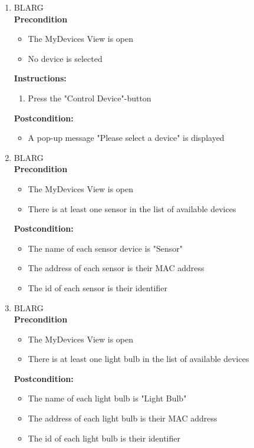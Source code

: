 \documentclass[a4paper]{article}
\newlength{\testlabellength}
\newenvironment{testlist}{\begin{enumerate}[label=\bfseries Instruction \thesubsection.\arabic* , labelindent=0pt, labelwidth=\testlabellength , leftmargin=2cm]}{\end{enumerate}}
\newenvironment{precondition}{
{\color{white}BLARG}\\ 
\textbf{Precondition}
\begin{itemize}[labelindent=0cm, labelwidth=2cm , leftmargin=1cm]
}
{\end{itemize}}
\newenvironment{instruction}{
\textbf{Instructions:}
\begin{enumerate}[label=\bfseries  \arabic*., labelindent=0cm, labelwidth=2cm , leftmargin=1cm]
}
{\end{enumerate}}
\newenvironment{postcondition}{
\textbf{Postcondition:}
\begin{itemize}[labelindent=0cm, labelwidth=2cm , leftmargin=1cm]
}
{\end{itemize}}
\begin{document}
\begin{appendices}
\begin{testlist}
    \item
    	\begin{precondition}
    		\item The MyDevices View is open
    		\item No device is selected
    	\end{precondition}
    	\begin{instruction}
    		\item Press the "Control Device"-button
    	\end{instruction}
    	\begin{postcondition}
    		\item A pop-up message "Please select a device" is displayed
    	\end{postcondition}
   
	\item
		\begin{precondition}
			\item The MyDevices View is open
			\item There is at least one sensor in the list of available devices
		\end{precondition}
		\begin{postcondition}
			\item The name of each sensor device is "Sensor"
			\item The address of each sensor is their MAC address
			\item The id of each sensor is their identifier
		\end{postcondition}
		   
   
	\item
		\begin{precondition}
			\item The MyDevices View is open
			\item There is at least one light bulb in the list of available devices
		\end{precondition}
		\begin{postcondition}
			\item The name of each light bulb is "Light Bulb"
			\item The address of each light bulb is their MAC address
			\item The id of each light bulb is their identifier
		\end{postcondition}
		   

\end{testlist}
\end{appendices}
\end{document}
